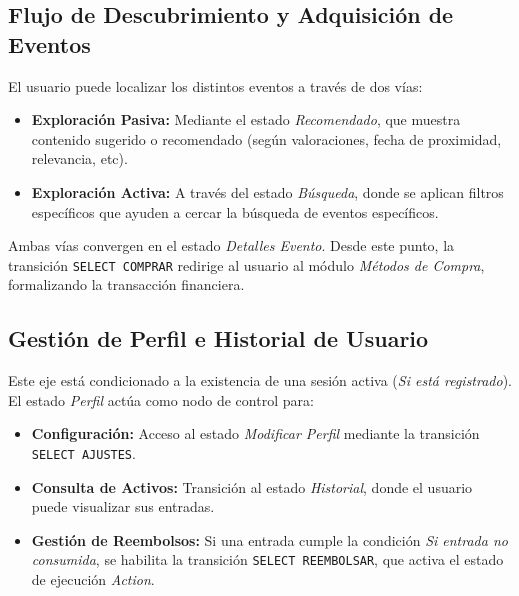 \documentclass[12pt,a4paper]{article}
\begin{document}
\subsection{Flujo de Descubrimiento y Adquisición de Eventos}
El usuario puede localizar los distintos eventos a través de dos vías:

\begin{itemize}
    \item \textbf{Exploración Pasiva:} Mediante el estado \textit{Recomendado}, que muestra contenido sugerido o recomendado (según valoraciones, fecha de proximidad, relevancia, etc).
    \item \textbf{Exploración Activa:} A través del estado \textit{Búsqueda}, donde se aplican filtros específicos que ayuden a cercar la búsqueda de eventos específicos.
\end{itemize}
Ambas vías convergen en el estado \textit{Detalles Evento}. Desde este punto, la transición \texttt{SELECT COMPRAR} redirige al usuario al módulo \textit{Métodos de Compra}, formalizando la transacción financiera.

\subsection{Gestión de Perfil e Historial de Usuario}
Este eje está condicionado a la existencia de una sesión activa (\textit{Si está registrado}). El estado \textit{Perfil} actúa como nodo de control para:
\begin{itemize}
    \item \textbf{Configuración:} Acceso al estado \textit{Modificar Perfil} mediante la transición \texttt{SELECT AJUSTES}.
    \item \textbf{Consulta de Activos:} Transición al estado \textit{Historial}, donde el usuario puede visualizar sus entradas.
    \item \textbf{Gestión de Reembolsos:} Si una entrada cumple la condición \textit{Si entrada no consumida}, se habilita la transición \texttt{SELECT REEMBOLSAR}, que activa el estado de ejecución \textit{Action}.
\end{itemize}

\end{document}

